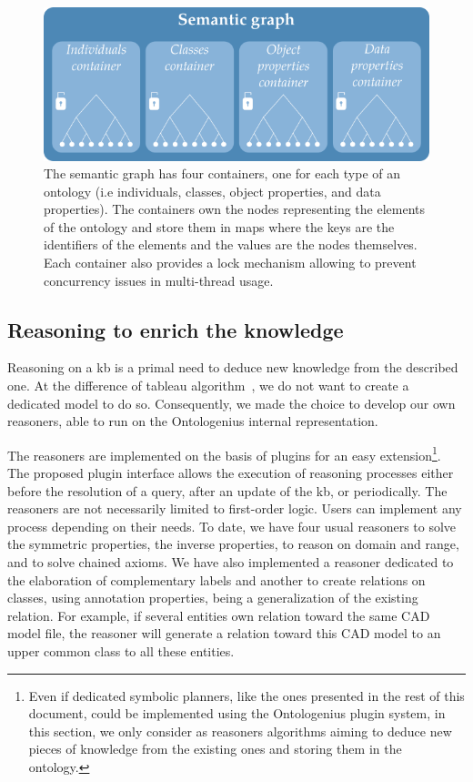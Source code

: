 \begin{figure}[ht!]
\centering
\includegraphics[scale=0.6]{figures/chapter2/containers.png}
\caption{\label{fig:chap2_containers} The semantic graph has four containers, one for each type of an ontology (i.e individuals, classes, object properties, and data properties). The containers own the nodes representing the elements of the ontology and store them in maps where the keys are the identifiers of the elements and the values are the nodes themselves. Each container also provides a lock mechanism allowing to prevent concurrency issues in multi-thread usage.}
\end{figure}

\subsection{Reasoning to enrich the knowledge}

Reasoning on a \acrlong{kb} is a primal need to deduce new knowledge from the described one. At the difference of tableau algorithm~\cite{zuo_2006_high}, we do not want to create a dedicated model to do so. Consequently, we made the choice to develop our own reasoners, able to run on the Ontologenius internal representation.

The reasoners are implemented on the basis of plugins for an easy extension\footnote{Even if dedicated symbolic planners, like the ones presented in the rest of this document, could be implemented using the Ontologenius plugin system, in this section, we only consider as reasoners algorithms aiming to deduce new pieces of knowledge from the existing ones and storing them in the ontology.}. The proposed plugin interface allows the execution of reasoning processes either before the resolution of a query, after an update of the \acrshort{kb}, or periodically. The reasoners are not necessarily limited to first-order logic. Users can implement any process depending on their needs. To date, we have four usual reasoners to solve the symmetric properties, the inverse properties, to reason on domain and range, and to solve chained axioms. We have also implemented a reasoner dedicated to the elaboration of complementary labels and another to create relations on classes, using annotation properties, being a generalization of the existing relation. For example, if several entities own relation toward the same CAD model file, the reasoner will generate a relation toward this CAD model to an upper common class to all these entities.

